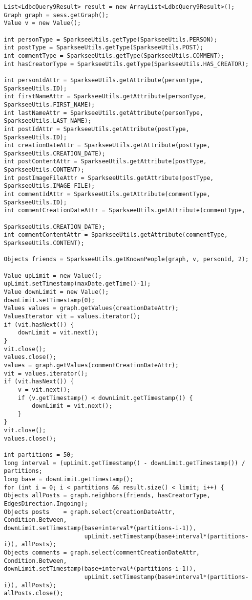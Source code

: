 {\footnotesize
\begin{verbatim}
List<LdbcQuery9Result> result = new ArrayList<LdbcQuery9Result>();
Graph graph = sess.getGraph();
Value v = new Value();

int personType = SparkseeUtils.getType(SparkseeUtils.PERSON);
int postType = SparkseeUtils.getType(SparkseeUtils.POST);
int commentType = SparkseeUtils.getType(SparkseeUtils.COMMENT);
int hasCreatorType = SparkseeUtils.getType(SparkseeUtils.HAS_CREATOR);

int personIdAttr = SparkseeUtils.getAttribute(personType, SparkseeUtils.ID);
int firstNameAttr = SparkseeUtils.getAttribute(personType, SparkseeUtils.FIRST_NAME);
int lastNameAttr = SparkseeUtils.getAttribute(personType, SparkseeUtils.LAST_NAME);
int postIdAttr = SparkseeUtils.getAttribute(postType, SparkseeUtils.ID);
int creationDateAttr = SparkseeUtils.getAttribute(postType, SparkseeUtils.CREATION_DATE);
int postContentAttr = SparkseeUtils.getAttribute(postType, SparkseeUtils.CONTENT);
int postImageFileAttr = SparkseeUtils.getAttribute(postType, SparkseeUtils.IMAGE_FILE);
int commentIdAttr = SparkseeUtils.getAttribute(commentType, SparkseeUtils.ID);
int commentCreationDateAttr = SparkseeUtils.getAttribute(commentType, 
                                                         SparkseeUtils.CREATION_DATE);
int commentContentAttr = SparkseeUtils.getAttribute(commentType, SparkseeUtils.CONTENT);

Objects friends = SparkseeUtils.getKnownPeople(graph, v, personId, 2);

Value upLimit = new Value();
upLimit.setTimestamp(maxDate.getTime()-1);
Value downLimit = new Value();
downLimit.setTimestamp(0);
Values values = graph.getValues(creationDateAttr);
ValuesIterator vit = values.iterator();
if (vit.hasNext()) {
    downLimit = vit.next();
}
vit.close();
values.close();
values = graph.getValues(commentCreationDateAttr);
vit = values.iterator();
if (vit.hasNext()) {
    v = vit.next();
    if (v.getTimestamp() < downLimit.getTimestamp()) {
        downLimit = vit.next();
    }
}
vit.close();
values.close();

int partitions = 50;
long interval = (upLimit.getTimestamp() - downLimit.getTimestamp()) / partitions;
long base = downLimit.getTimestamp();
for (int i = 0; i < partitions && result.size() < limit; i++) {
Objects allPosts = graph.neighbors(friends, hasCreatorType, EdgesDirection.Ingoing);
Objects posts    = graph.select(creationDateAttr,        Condition.Between,
downLimit.setTimestamp(base+interval*(partitions-i-1)), 
                       upLimit.setTimestamp(base+interval*(partitions-i)), allPosts);
Objects comments = graph.select(commentCreationDateAttr, Condition.Between,
downLimit.setTimestamp(base+interval*(partitions-i-1)), 
                       upLimit.setTimestamp(base+interval*(partitions-i)), allPosts);
allPosts.close();


\end{verbatim}}
